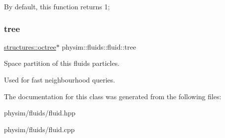 By default, this function returns 1; \mbox{\label{classphysim_1_1fluids_1_1fluid_a9728c3603981a5a4658a263b900c1c3c}} 
\subsubsection{\texorpdfstring{tree}{tree}}
{\footnotesize\ttfamily \hyperlink{classphysim_1_1structures_1_1octree}{structures\+::octree}$\ast$ physim\+::fluids\+::fluid\+::tree\hspace{0.3cm}{\ttfamily [protected]}}



Space partition of this fluid\textquotesingle{}s particles. 

Used for fast neighbourhood queries. 

The documentation for this class was generated from the following files\+:\begin{DoxyCompactItemize}
\item 
physim/fluids/fluid.\+hpp\item 
physim/fluids/fluid.\+cpp\end{DoxyCompactItemize}
